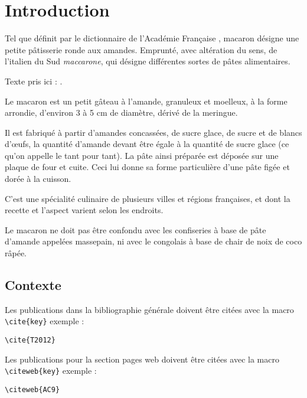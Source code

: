 
\chapter{Introduction}

Tel que définit par le dictionnaire de l'Académie Française , macaron désigne une petite pâtisserie ronde aux amandes. Emprunté, avec altération du sens, de l’italien du Sud \textit{maccarone}, qui désigne différentes sortes de pâtes alimentaires.

Texte pris ici : .

Le macaron est un petit gâteau à l'amande, granuleux et moelleux, à la forme arrondie, d'environ 3 à 5 cm de diamètre, dérivé de la meringue.

Il est fabriqué à partir d'amandes concassées, de sucre glace, de sucre et de blancs d'œufs, la quantité d'amande devant être égale à la quantité de sucre glace (ce qu'on appelle le tant pour tant). La pâte ainsi préparée est déposée sur une plaque de four et cuite. Ceci lui donne sa forme particulière d'une pâte figée et dorée à la cuisson.

C'est une spécialité culinaire de plusieurs villes et régions françaises, et dont la recette et l'aspect varient selon les endroits.

Le macaron ne doit pas être confondu avec les confiseries à base de pâte d'amande appelées massepain, ni avec le congolais à base de chair de noix de coco râpée.

\section{Contexte}

Les publications dans la bibliographie générale doivent être citées avec la macro \texttt{\textbackslash cite\{key\}} exemple : \\

\noindent\cite{T2012} 
\begin{verbatim}\cite{T2012}\end{verbatim}

Les publications pour la section pages web doivent être citées avec la macro \texttt{\textbackslash citeweb\{key\}} exemple : \\

\noindent{} 
\begin{verbatim}\citeweb{AC9}\end{verbatim}

